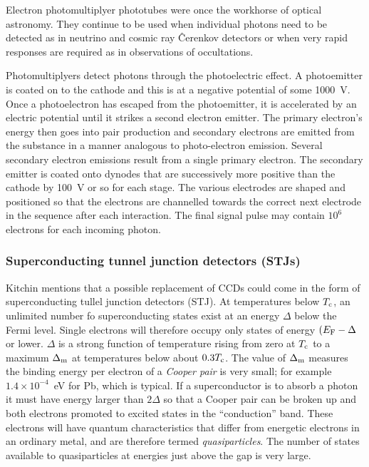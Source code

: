 Electron photomultiplyer phototubes were once the workhorse of optical 
astronomy. They continue to be used when individual photons need to be
detected  as in neutrino and cosmic ray \^Cerenkov detectors or when very
rapid responses are required as in observations of occultations.

Photomultiplyers detect photons through the photoelectric effect. A 
photoemitter is coated on to the cathode and this is at a negative potential
of some 1000~V. Once a photoelectron has escaped from the photoemitter, it
is accelerated by an electric potential until it strikes a second 
electron emitter. The primary electron's energy then goes into pair production
and secondary electrons are emitted from the substance in a manner analogous
to photo-electron emission. Several secondary electron emissions result 
from a single primary electron. The secondary emitter is coated onto dynodes
that are successively more positive than the cathode by 100~V or so for each
stage. The various electrodes are shaped and positioned so that the electrons
are channelled towards the correct next electrode in the sequence after 
each interaction. The final signal pulse may contain $10^6$ electrons for each
incoming photon. 

\subsubsection{Superconducting tunnel junction detectors (STJs)}

Kitchin mentions that a possible replacement of CCDs could come in the form
of superconducting tullel junction detectors (STJ). At temperatures
below $T_{\rm c}$, an unlimited number fo superconducting states exist
at an energy $\Delta$ below the Fermi level. Single electrons will
therefore occupy only states of energy $(E_{\rm F}-\Delta$ or
  lower. $\Delta$ is a strong function of temperature rising from zero
  at $T_{\rm c}$ to a maximum $\Delta_{\rm m}$ at temperatures below
  about $0.3T_{\rm c}$. The value of $\Delta_{\rm m}$ measures the
  binding energy per electron of a {\it Cooper pair} is very small;
  for example $1.4\times 10^{-4}$~eV for Pb, which is typical. If a
  superconductor is to absorb a photon it must have energy larger than
  $2\Delta$ so that a Cooper pair can be broken up and both electrons
  promoted to excited states in the ``conduction'' band. These
  electrons will have quantum characteristics that differ from
  energetic electrons in an ordinary metal, and are therefore termed
  {\it quasiparticles}. The number of states available to
  quasiparticles at energies just above the gap is very large.

